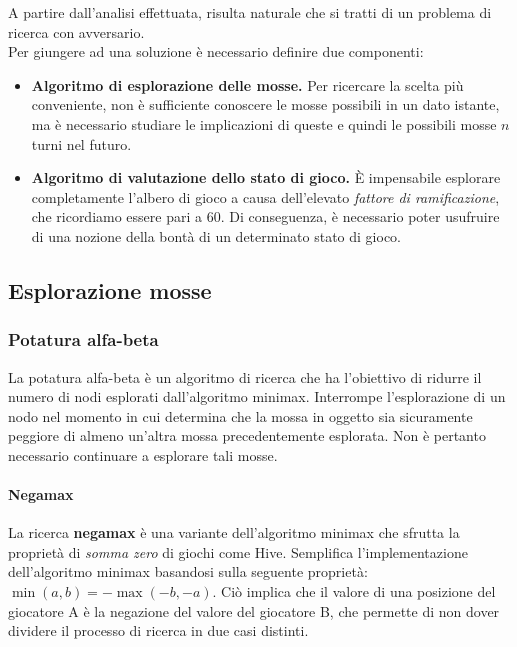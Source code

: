 \documentclass[a4paper,12pt]{article}
\begin{document}
    A partire dall'analisi effettuata, risulta naturale che si tratti di un problema di ricerca con avversario.\\
    Per giungere ad una soluzione è necessario definire due componenti:
    \begin{itemize}
        \item \textbf{Algoritmo di esplorazione delle mosse.} Per ricercare la scelta più conveniente, non è sufficiente conoscere le mosse possibili in un dato istante, ma è necessario studiare le implicazioni di queste e quindi le possibili mosse $n$ turni nel futuro.
        \item \textbf{Algoritmo di valutazione dello stato di gioco.} È impensabile esplorare completamente l'albero di gioco a causa dell'elevato \textit{fattore di ramificazione}, che ricordiamo essere pari a 60. Di conseguenza, è necessario poter usufruire di una nozione della bontà di un determinato stato di gioco.
    \end{itemize}

    \subsection{Esplorazione mosse}

    \subsubsection{Potatura alfa-beta}
    La potatura alfa-beta è un algoritmo di ricerca che ha l'obiettivo di ridurre il numero di nodi esplorati dall'algoritmo minimax. Interrompe l'esplorazione di un nodo nel momento in cui determina che la mossa in oggetto sia sicuramente peggiore di almeno un'altra mossa precedentemente esplorata. Non è pertanto necessario continuare a esplorare tali mosse.

    \paragraph{Negamax} \hfill

    La ricerca \textbf{negamax} è una variante dell'algoritmo minimax che sfrutta la proprietà di \textit{somma zero} di giochi come Hive. Semplifica l'implementazione dell'algoritmo minimax basandosi sulla seguente proprietà: $\min(a,b)=-\max(-b,-a)$. Ciò implica che il valore di una posizione del giocatore A è la negazione del valore del giocatore B, che permette di non dover dividere il processo di ricerca in due casi distinti.
\end{document}
